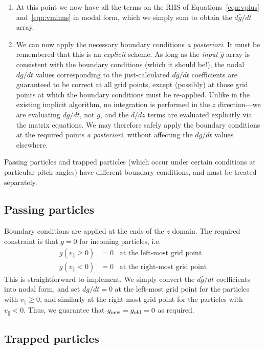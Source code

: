 \documentclass[10pt,a4paper]{article}
\begin{document}
\begin{enumerate}
\item At this point we now have all the terms on the RHS of
  Equations~\ref{eqn:vplus} and~\ref{eqn:vminus} in modal form, which we
  simply sum to obtain the $d\hat{g}/dt$ array.

\item We can now apply the necessary boundary conditions \textit{a
    posteriori}. It must be remembered that this is an \textit{explicit}\/
  scheme. As long as the \textit{input}\/ $\hat{g}$ array is consistent with
  the boundary conditions (which it should be!), the nodal $dg/dt$ values
  corresponding to the just-calculated $d\hat{g}/dt$ coefficients are
  guaranteed to be correct at all grid points, except (possibly) at those grid
  points at which the boundary conditions must be re-applied. Unlike in the
  existing implicit algorithm, no integration is performed in the $z$
  direction---we are evaluating $dg/dt$, not $g$, and the $d/dz$ terms are
  evaluated explicitly via the matrix equations. We may therefore safely apply
  the boundary conditions at the required points \textit{a posteriori},
  without affecting the $dg/dt$ values elsewhere.

\end{enumerate}

Passing particles and trapped particles (which occur under certain conditions
at particular pitch angles) have different boundary conditions, and must be
treated separately.

\subsection{Passing particles}

Boundary conditions are applied at the ends of the $z$ domain. The required
constraint is that $g = 0$ for incoming particles, i.e.
\begin{align*}
g(v_\parallel \geq 0) & = 0 \;\;\; \mbox{at the left-most grid point} \\
g(v_\parallel < 0) & = 0 \;\;\; \mbox{at the right-most grid point}
\end{align*}
This is straightforward to implement. We simply convert the $d\hat{g}/dt$
coefficients into nodal form, and set $dg/dt=0$ at the left-most grid point
for the particles with $v_\parallel \geq 0$, and similarly at the right-most
grid point for the particles with $v_\parallel < 0$. Thus, we guarantee that
$g_{\mbox{\scriptsize new}} = g_{\mbox{\scriptsize old}} = 0$ as required.

\subsection{Trapped particles}
\end{document}
